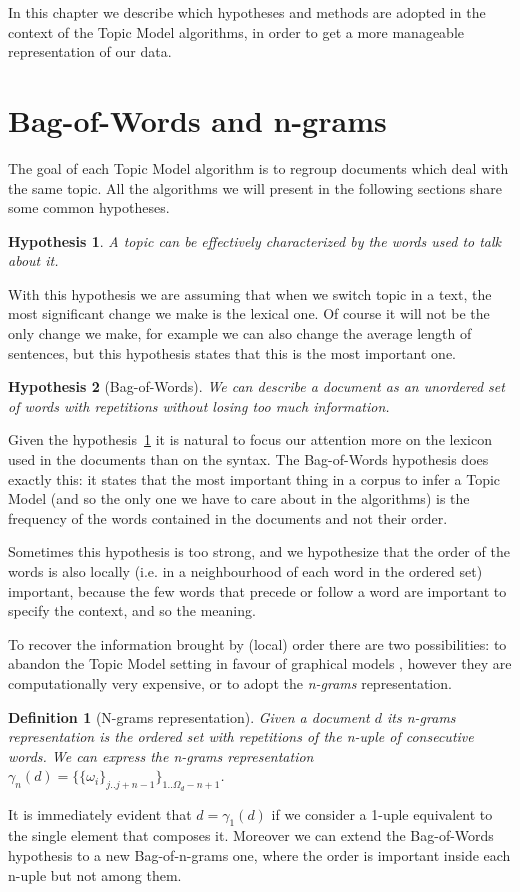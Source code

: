 \documentclass[11pt, a4paper, oneside, openright]{book}
\newtheorem{definition}{Definition}
\newtheorem{hypothesis}{Hypothesis}
\begin{document}
In this chapter we describe which hypotheses and methods are adopted in the context of the Topic Model algorithms, in order to get a more manageable representation of our data.

\section{Bag-of-Words and n-grams}
\label{sec:bow}
The goal of each Topic Model algorithm is to regroup documents which deal with the same topic.
All the algorithms we will present in the following sections share some common hypotheses.
\begin{hypothesis}
	\label{hyp:topic}
	A topic can be effectively characterized by the words used to talk about it.
\end{hypothesis}
With this hypothesis we are assuming that when we switch topic in a text, the most significant change we make is the lexical one. Of course it will not be the only change we make, for example we can also change the average length of sentences, but this hypothesis states that this is the most important one.
\begin{hypothesis}[Bag-of-Words]
	We can describe a document as an \textit{unordered} set of words with repetitions without losing too much information.
\end{hypothesis}
Given the hypothesis~\ref{hyp:topic} it is natural to focus our attention more on the lexicon used in the documents than on the syntax. The Bag-of-Words hypothesis does exactly this: it states that the most important thing in a corpus to infer a Topic Model (and so the only one we have to care about in the algorithms) is the frequency of the words contained in the documents and not their order.

Sometimes this hypothesis is too strong, and we hypothesize that the order of the words is also locally (i.e. in a neighbourhood of each word in the ordered set) important, because the few words that precede or follow a word are important to specify the context, and so the meaning.

To recover the information brought by (local) order there are two possibilities: to abandon the Topic Model setting in favour of graphical models \parencite[e.g.][]{kang2018}, however they are computationally very expensive, or to adopt the \textit{n-grams} representation.
\begin{definition}[N-grams representation]
	Given a document $d$ its n-grams representation is the ordered set with repetitions of the n-uple of consecutive words. We can express the n-grams representation $\gamma_n(d) = \{\{\omega_i\}_{j..j+n-1}\}_{1..\Omega_d-n+1}$.
\end{definition}
It is immediately evident that $d = \gamma_1(d)$ if we consider a 1-uple equivalent to the single element that composes it. Moreover we can extend the Bag-of-Words hypothesis to a new Bag-of-n-grams one, where the order is important inside each n-uple but not among them.
\end{document}
